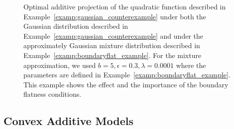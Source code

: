 \begin{figure}[htp]
\vskip-10pt
	\centering
\caption{Optimal additive projection of the quadratic function described in Example~\ref{examp:gaussian_counterexample} under both the Gaussian distribution described in Example~\ref{examp:gaussian_counterexample} and under the approximately Gaussian mixture distribution described in Example~\ref{examp:boundaryflat_example}. For the mixture approximation, we used $b=5, \epsilon=0.3, \lambda=0.0001$ where the parameters are defined in Example~\ref{examp:boundaryflat_example}. This example shows the effect and the importance of the boundary flatness conditions.}
\vskip-10pt
\end{figure}


\subsection{Convex Additive Models}

